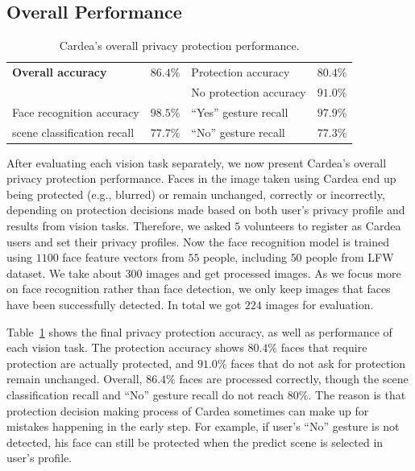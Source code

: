\subsection{Overall Performance}

\begin{table}[tb]
\centering
\caption{Cardea's overall privacy protection performance.}
\label{tbl-overallperform}
\begin{tabular}{lr|lr}
\toprule
\textbf{Overall accuracy}   & $\mathbf{86.4\%}$ & Protection accuracy   & $80.4\%$  \\
                            &                   &  No protection accuracy& $91.0\%$ \\ \midrule
Face recognition accuracy   & $98.5\%$  & ``Yes'' gesture recall        & $97.9\%$  \\
scene classification recall & $77.7\%$  & ``No'' gesture recall     & $77.3\%$  \\ \bottomrule

\end{tabular}
\end{table}

After evaluating each vision task separately, we now present Cardea's overall privacy protection performance. Faces in the image taken using Cardea end up being protected (e.g., blurred) or remain unchanged, correctly or incorrectly, depending on protection decisions made based on both user's privacy profile and results from vision tasks. Therefore, we asked $5$ volunteers to register as Cardea users and set their privacy profiles. Now the face recognition model is trained using $1100$ face feature vectors from $55$ people, including $50$ people from LFW dataset. We take about $300$ images and get processed images. As we focus more on face recognition rather than face detection, we only keep images that faces have been successfully detected. In total we got $224$ images for evaluation.

Table~\ref{tbl-overallperform} shows the final privacy protection accuracy, as well as performance of each vision task. The protection accuracy shows $80.4\%$ faces that require protection are actually protected, and $91.0\%$ faces that do not ask for protection remain unchanged. Overall, $86.4\%$ faces are processed correctly, though the scene classification recall and ``No'' gesture recall do not reach $80\%$. The reason is that protection decision making process of Cardea sometimes can make up for mistakes happening in the early step. For example, if user's ``No'' gesture is not detected, his face can still be protected when the predict scene is selected in user's profile.

